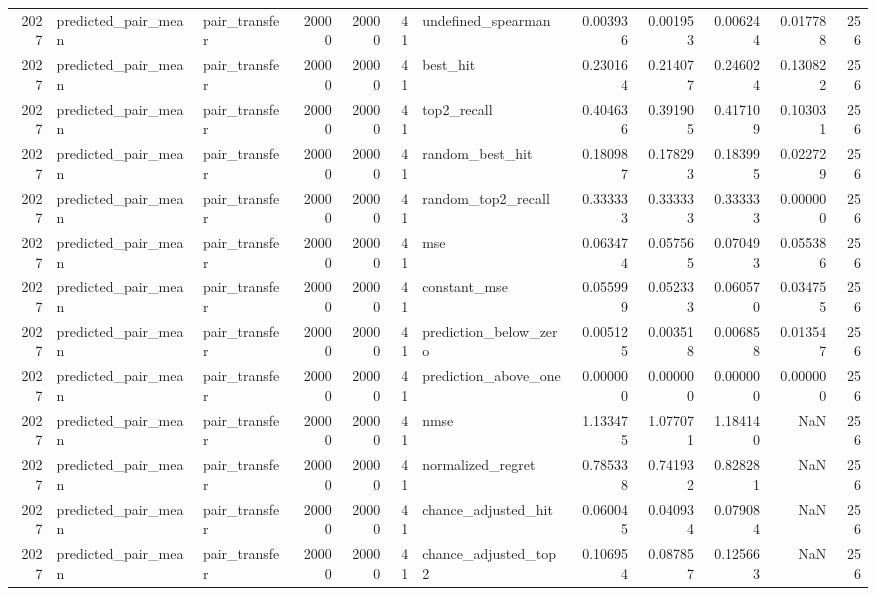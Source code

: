 \begin{tabular}{rllrrrlrrrrr}
2027 & predicted_pair_mean & pair_transfer & 20000 & 20000 & 41 & undefined_spearman & 0.003936 & 0.001953 & 0.006244 & 0.017788 & 256 \\
2027 & predicted_pair_mean & pair_transfer & 20000 & 20000 & 41 & best_hit & 0.230164 & 0.214077 & 0.246024 & 0.130822 & 256 \\
2027 & predicted_pair_mean & pair_transfer & 20000 & 20000 & 41 & top2_recall & 0.404636 & 0.391905 & 0.417109 & 0.103031 & 256 \\
2027 & predicted_pair_mean & pair_transfer & 20000 & 20000 & 41 & random_best_hit & 0.180987 & 0.178293 & 0.183995 & 0.022729 & 256 \\
2027 & predicted_pair_mean & pair_transfer & 20000 & 20000 & 41 & random_top2_recall & 0.333333 & 0.333333 & 0.333333 & 0.000000 & 256 \\
2027 & predicted_pair_mean & pair_transfer & 20000 & 20000 & 41 & mse & 0.063474 & 0.057565 & 0.070493 & 0.055386 & 256 \\
2027 & predicted_pair_mean & pair_transfer & 20000 & 20000 & 41 & constant_mse & 0.055999 & 0.052333 & 0.060570 & 0.034755 & 256 \\
2027 & predicted_pair_mean & pair_transfer & 20000 & 20000 & 41 & prediction_below_zero & 0.005125 & 0.003518 & 0.006858 & 0.013547 & 256 \\
2027 & predicted_pair_mean & pair_transfer & 20000 & 20000 & 41 & prediction_above_one & 0.000000 & 0.000000 & 0.000000 & 0.000000 & 256 \\
2027 & predicted_pair_mean & pair_transfer & 20000 & 20000 & 41 & nmse & 1.133475 & 1.077071 & 1.184140 & NaN & 256 \\
2027 & predicted_pair_mean & pair_transfer & 20000 & 20000 & 41 & normalized_regret & 0.785338 & 0.741932 & 0.828281 & NaN & 256 \\
2027 & predicted_pair_mean & pair_transfer & 20000 & 20000 & 41 & chance_adjusted_hit & 0.060045 & 0.040934 & 0.079084 & NaN & 256 \\
2027 & predicted_pair_mean & pair_transfer & 20000 & 20000 & 41 & chance_adjusted_top2 & 0.106954 & 0.087857 & 0.125663 & NaN & 256 \\
\bottomrule
\end{tabular}
